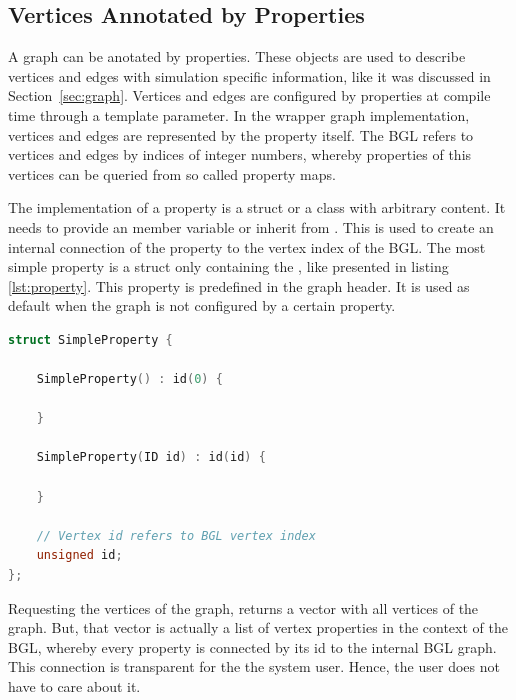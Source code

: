 \subsection{Vertices Annotated by Properties}

A graph can be anotated by properties. These objects are used to
describe vertices and edges with simulation specific information, like
it was discussed in Section~\ref{sec:graph}. Vertices and edges are
configured by properties at compile time through a template
parameter. In the wrapper graph implementation, vertices and edges are
represented by the property itself. The BGL refers to vertices and
edges by indices of integer numbers, whereby properties of this
vertices can be queried from so called property maps.

The implementation of a property is a struct or a class with arbitrary
content. It needs to provide an  member variable or inherit
from . This  is used to create an internal
connection of the property to the vertex index of the BGL.  The most
simple property is a struct only containing the , like
presented in listing \ref{lst:property}. This property is predefined
in the graph header. It is used as default when the graph is
not configured by a certain property.

\begin{lstlisting}[language=C++, label=lst:property]
struct SimpleProperty {

    SimpleProperty() : id(0) {

    }
    
    SimpleProperty(ID id) : id(id) {

    }

    // Vertex id refers to BGL vertex index
    unsigned id;
};
\end{lstlisting}

\noindent Requesting the vertices of the graph, returns a vector with
all vertices of the graph. But, that vector is actually a list of
vertex properties in the context of the BGL, whereby every property is
connected by its id to the internal BGL graph. This connection is
transparent for the the system user. Hence, the user does not have to
care about it.

